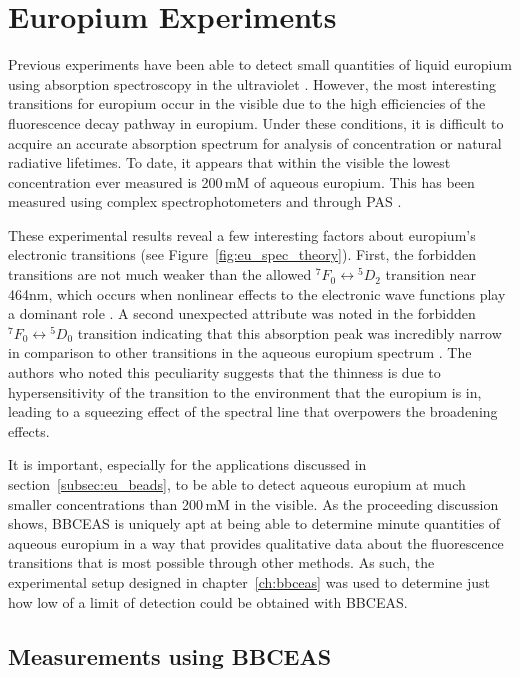 \chapter{Europium Experiments}\label{ch:eu_exp}

Previous experiments have been able to detect small quantities of liquid
europium using absorption spectroscopy in the ultraviolet \cite{Yun:2001wc}.
However, the most interesting transitions for europium occur in the visible due
to the high efficiencies of the fluorescence decay pathway in europium. Under
these conditions, it is difficult to acquire an accurate absorption spectrum
for analysis of concentration or natural radiative lifetimes. To date, it
appears that within the visible the lowest concentration ever measured is
200\,mM of aqueous europium. This has been measured using complex
spectrophotometers and through \ac{PAS} \cite{Sawada:1979vca}.

These experimental results reveal a few interesting factors about
europium's electronic transitions (see Figure~\ref{fig:eu_spec_theory}).
First, the forbidden transitions are not much weaker than the allowed
${}^7F_0 \leftrightarrow {}^5D_2$ transition near 464nm, which occurs when
nonlinear effects to the electronic wave functions play a dominant role
\cite{Walsh:2005te}. A second unexpected attribute was noted in the forbidden
${}^7F_0 \leftrightarrow {}^5D_0$ transition indicating that this absorption
peak was incredibly narrow in comparison to other transitions in the aqueous
europium spectrum \cite{Sawada:1979vca}. The authors who noted this
peculiarity suggests that the thinness is due to hypersensitivity of the
transition to the environment that the europium is in, leading to a squeezing
effect of the spectral line that overpowers the broadening effects.

It is important, especially for the applications discussed in
section~\ref{subsec:eu_beads}, to be able to detect aqueous europium at
much smaller concentrations than 200\,mM in the visible. As the proceeding
discussion shows, \ac{BBCEAS} is uniquely apt at being able to determine
minute quantities of aqueous europium in a way that provides qualitative
data about the fluorescence transitions that is most possible through other
methods. As such, the experimental setup designed in chapter~\ref{ch:bbceas}
was used to determine just how low of a limit of detection could be obtained
with \ac{BBCEAS}.



\section{Measurements using BBCEAS}\label{sec:eu_measurements}

